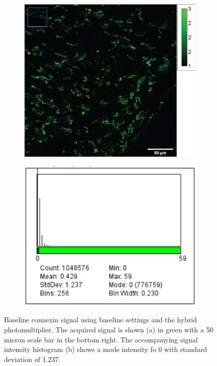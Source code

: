 \documentclass[12pt]{article}
\begin{document}
\begin{figure}
	\begin{subfigure}{.5\textwidth}
		\centering
		\includegraphics[width=.95\linewidth]{FinalFigures/CX43_Baseline.png}
		\caption{}
		\label{fig:cx43_b}
	\end{subfigure}%
	\begin{subfigure}{.5\textwidth}
		\centering
		\includegraphics[width=.95\linewidth]{FinalFigures/CX43_baseline_Hist.png}
		\caption{}
		\label{fig:cx43_b_hist}
	\end{subfigure}
	\caption{Baseline connexin signal using baseline settings and the hybrid photomultiplier. The acquired signal is shown (a) in green with a 50 micron scale bar in the bottom right. The accompanying signal intensity histogram (b) shows a mode intensity fo 0 with standard deviation of 1.237.}
	\label{fig:cx43_base}
\end{figure}
\end{document}
